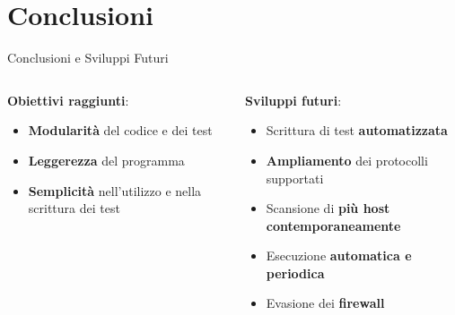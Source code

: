 \section{Conclusioni}


\begin{frame}{Conclusioni e Sviluppi Futuri}
    \begin{columns} 
    \begin{column}{0.5\textwidth}
    \textbf{Obiettivi raggiunti}:
    \begin{itemize}
    \item \textbf{Modularità} del codice e dei test
    \item \textbf{Leggerezza} del programma
    \item \textbf{Semplicità} nell'utilizzo e nella scrittura dei test
    \end{itemize}
    \end{column}
    \begin{column}{0.5\textwidth}
    \textbf{Sviluppi futuri}:
    \begin{itemize}
    \item Scrittura di test \textbf{automatizzata}
    \item \textbf{Ampliamento} dei protocolli supportati
    \item Scansione di \textbf{più host contemporaneamente}
    \item Esecuzione \textbf{automatica e periodica}
    \item Evasione dei \textbf{firewall}
    \end{itemize}
    \end{column}
    \end{columns}
\end{frame}

